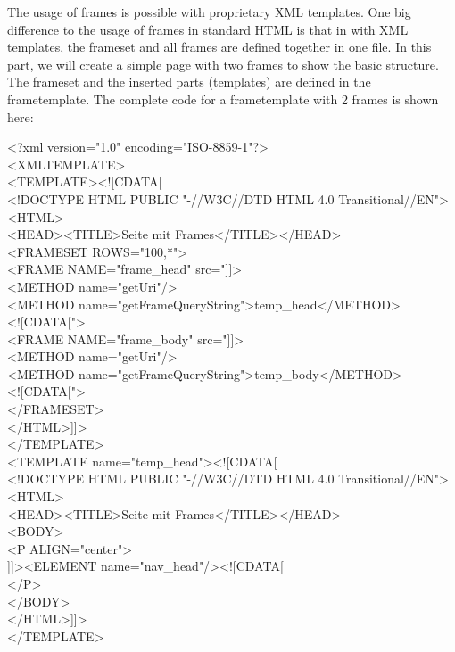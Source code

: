 The usage of frames is possible with proprietary XML templates. One big difference
to the usage of frames in standard HTML is that in with XML templates,
the frameset and all frames are defined together in one file.  In this part, we will
create a simple page with two frames to show the basic structure.
The frameset and the inserted parts (templates) are defined in the
frametemplate. The complete code for a frametemplate with 2 frames
is shown here:
\begin{xml}
<?xml version="1.0" encoding="ISO-8859-1"?>\\
<XMLTEMPLATE>\\

<TEMPLATE><![CDATA[\\
<!DOCTYPE HTML PUBLIC "-//W3C//DTD HTML 4.0 Transitional//EN">\\
<HTML>\\
  <HEAD><TITLE>Seite mit Frames</TITLE></HEAD>\\
  <FRAMESET ROWS="100,*">\\
\xtaba     <FRAME NAME="frame\_head" src="]]>\\
\xtabb <METHOD name="getUri"/>\\
\xtabb            <METHOD name="getFrameQueryString">temp\_head</METHOD>\\
\xtabb            <![CDATA[">\\
\xtaba     <FRAME NAME="frame\_body" src="]]>\\
\xtabb            <METHOD name="getUri"/>\\
\xtabb            <METHOD name="getFrameQueryString">temp\_body</METHOD>\\
\xtabb            <![CDATA[">\\
  </FRAMESET>\\
</HTML>]]>\\
</TEMPLATE>\\
<TEMPLATE name="temp\_head"><![CDATA[\\
\xtaba <!DOCTYPE HTML PUBLIC "-//W3C//DTD HTML 4.0 Transitional//EN">\\
\xtaba <HTML>\\
\xtaba   <HEAD><TITLE>Seite mit Frames</TITLE></HEAD>\\
\xtaba   <BODY>\\
\xtabb             <P ALIGN="center">\\
\xtabb       ]]><ELEMENT name="nav\_head"/><![CDATA[\\
\xtabb     </P>\\
\xtaba   </BODY>\\
\xtaba </HTML>]]>\\
</TEMPLATE>\\


\end{xml}
